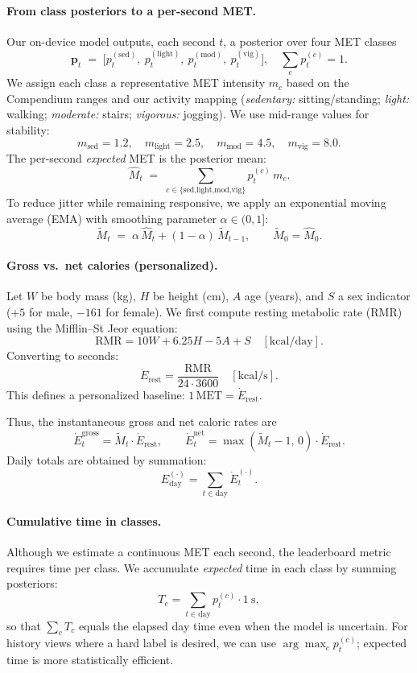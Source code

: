 \documentclass[10pt,twocolumn]{article}
\begin{document}
\paragraph{From class posteriors to a per-second MET.}
Our on-device model outputs, each second $t$, a posterior over four MET classes
\[
\mathbf{p}_t \;=\; \big[p_t^{(\text{sed})},~p_t^{(\text{light})},~p_t^{(\text{mod})},~p_t^{(\text{vig})}\big],\quad \sum_c p_t^{(c)}=1.
\]
We assign each class a representative MET intensity $m_c$ based on the Compendium ranges and our activity mapping (\emph{sedentary:} sitting/standing; \emph{light:} walking; \emph{moderate:} stairs; \emph{vigorous:} jogging). We use mid-range values for stability:
\[
m_{\text{sed}}=1.2,\quad
m_{\text{light}}=2.5,\quad
m_{\text{mod}}=4.5,\quad
m_{\text{vig}}=8.0.
\]
The per-second \emph{expected} MET is the posterior mean:
\[
\widehat{M}_t \;=\; \sum_{c\in\{\text{sed,light,mod,vig}\}} p_t^{(c)}\, m_c.
\]
To reduce jitter while remaining responsive, we apply an exponential moving average (EMA) with smoothing parameter $\alpha\in(0,1]$:
\[
\widetilde{M}_t \;=\; \alpha\,\widehat{M}_t + (1-\alpha)\,\widetilde{M}_{t-1},\qquad \widetilde{M}_0=\widehat{M}_0.
\]

\paragraph{Gross vs.\ net calories (personalized).}
Let $W$ be body mass (kg), $H$ be height (cm), $A$ age (years), and $S$ a sex indicator ($+5$ for male, $-161$ for female).
We first compute resting metabolic rate (RMR) using the Mifflin–St Jeor equation:
\[
\mathrm{RMR} = 10W + 6.25H - 5A + S \quad [\mathrm{kcal/day}].
\]
Converting to seconds:
\[
\dot{E}_{\mathrm{rest}} = \frac{\mathrm{RMR}}{24 \cdot 3600} \quad [\mathrm{kcal/s}].
\]
This defines a personalized baseline: $1\,\text{MET} = \dot{E}_{\mathrm{rest}}$.

Thus, the instantaneous gross and net caloric rates are
\[
\dot{E}^{\text{gross}}_t = \widetilde{M}_t \cdot \dot{E}_{\mathrm{rest}},
\qquad
\dot{E}^{\text{net}}_t = \max(\widetilde{M}_t-1,\,0) \cdot \dot{E}_{\mathrm{rest}}.
\]
Daily totals are obtained by summation:
\[
E^{(\cdot)}_{\text{day}} = \sum_{t\in \text{day}} \dot{E}^{(\cdot)}_t.
\]

\paragraph{Cumulative time in classes.}
Although we estimate a continuous MET each second, the leaderboard metric requires time per class.
We accumulate \emph{expected} time in each class by summing posteriors:
\[
T_c = \sum_{t\in \text{day}} p_t^{(c)} \cdot 1~\mathrm{s},
\]
so that $\sum_c T_c$ equals the elapsed day time even when the model is uncertain. For history views where a hard label is desired, we can use $\arg\max_c p_t^{(c)}$; expected time is more statistically efficient.
\end{document}
